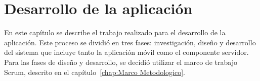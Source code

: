 \chapter{Desarrollo de la aplicación} \label{chapter:Desarrollo de la aplicacion}

En este capítulo se describe el trabajo realizado para el desarrollo de la aplicación. Este proceso se dividió en tres fases: investigación, diseño y desarrollo del sistema que incluye tanto la aplicación móvil como el componente servidor. Para las fases de diseño y desarrollo, se decidió utilizar el marco de trabajo Scrum, descrito en el capítulo~\ref{chap:Marco Metodologico}.
